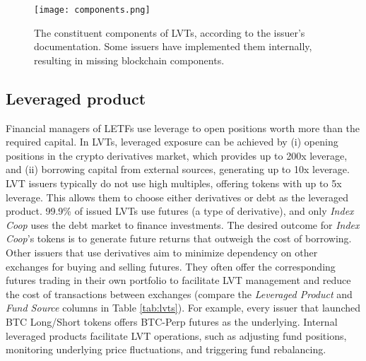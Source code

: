 \begin{figure}[t]
	\centering
	\texttt{[image: components.png]}
	\caption{The constituent components of LVTs, according to the issuer's documentation. Some issuers have implemented them internally, resulting in missing blockchain components.}
	\label{fig:components}
\end{figure}

\subsection{Leveraged product}\label{subsec:leveragedproduct}
Financial managers of LETFs use leverage to open positions worth more than the required capital. In LVTs, leveraged exposure can be achieved by (i) opening positions in the crypto derivatives market, which provides up to 200x leverage, and (ii) borrowing capital from external sources, generating up to 10x leverage. LVT issuers typically do not use high multiples, offering tokens with up to 5x leverage. This allows them to choose either derivatives or debt as the leveraged product. 99.9\% of issued LVTs use futures (a type of derivative), and only \textsl{Index Coop} uses the debt market to finance investments. The desired outcome for \textsl{Index Coop}'s tokens is to generate future returns that outweigh the cost of borrowing. Other issuers that use derivatives aim to minimize dependency on other exchanges for buying and selling futures. They often offer the corresponding futures trading in their own portfolio to facilitate LVT management and reduce the cost of transactions between exchanges (compare the \textsl{Leveraged Product} and \textsl{Fund Source} columns in Table \ref{tab:lvts}). For example, every issuer that launched BTC Long/Short tokens offers BTC-Perp futures as the underlying. Internal leveraged products facilitate LVT operations, such as adjusting fund positions, monitoring underlying price fluctuations, and triggering fund rebalancing.


